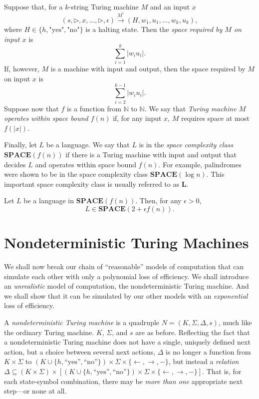 \documentclass[12pt]{article}
\begin{document}
\begin{defbox}
  Suppose that, for a $k$-string Turing machine $M$ and an input $x$ 
\[
(s, \triangleright, x, \ldots, \triangleright, \epsilon) \xrightarrow{M^*} (H, w_1, u_1, \ldots, w_k, u_k),
\]
where $H \in \{h, \text{"yes"}, \text{"no"}\}$ is a halting state. Then the \textit{space required by $M$ on input $x$} is 
\[
\sum_{i=1}^k |w_i u_i|.
\]
If, however, $M$ is a machine with input and output, then the space required by $M$ on input $x$ is 
\[
\sum_{i=2}^{k-1} |w_i u_i|.
\]
Suppose now that $f$ is a function from $\mathbb{N}$ to $\mathbb{N}$. We say that \textit{Turing machine $M$ operates within space bound $f(n)$} if, for any input $x$, $M$ requires space at most $f(|x|)$.

Finally, let $L$ be a language. We say that $L$ is in the \textit{space complexity class} $\textbf{SPACE}(f(n))$ if there is a Turing machine with input and output that decides $L$ and operates within space bound $f(n)$. For example, palindromes were shown to be in the space complexity class $\textbf{SPACE}(\log n)$. This important space complexity class is usually referred to as $\mathbf{L}$.  
\end{defbox}

\begin{defbox}[Theorem]
  Let $L$ be a language in $\textbf{SPACE}(f(n))$. Then, for any $\epsilon > 0$, 
\[
L \in \textbf{SPACE}(2 + \epsilon f(n)).
\]
\end{defbox}

\section{Nondeterministic Turing Machines}
We shall now break our chain of ``reasonable'' models of computation that can simulate each other with only a polynomial loss of efficiency. We shall introduce an \textit{unrealistic} model of computation, the nondeterministic Turing machine. And we shall show that it can be simulated by our other models with an \textit{exponential} loss of efficiency.
\begin{defbox}
  
  A \textit{nondeterministic Turing machine} is a quadruple $N = (K, \Sigma, \Delta, s)$, much like the ordinary Turing machine. $K$, $\Sigma$, and $s$ are as before. Reflecting the fact that a nondeterministic Turing machine does not have a single, uniquely defined next action, but a choice between several next actions, $\Delta$ is no longer a function from $K \times \Sigma$ to $(K \cup \{h, \text{``yes''}, \text{``no''}\}) \times \Sigma \times \{ \leftarrow, \rightarrow, - \}$, but instead a \textit{relation} $\Delta \subseteq (K \times \Sigma) \times [(K \cup \{h, \text{``yes''}, \text{``no''}\}) \times \Sigma \times \{ \leftarrow, \rightarrow, - \}]$. That is, for each state-symbol combination, there may be \textit{more than one} appropriate next step—or none at all.
\end{defbox}
\end{document}

